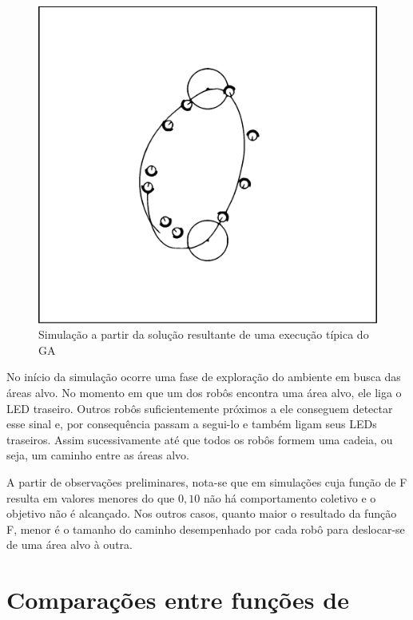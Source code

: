 \begin{figure}[h]
\begin{minipage}{.3\textwidth}
    \end{minipage}%
    \begin{minipage}{.3\textwidth}
        \includegraphics[width=\textwidth]{figures/simulation-28-t120-bold}
    \end{minipage}

    \caption{Simulação a partir da solução resultante de uma execução típica do GA}
    \label{fig:sim}
\end{figure}

No início da simulação ocorre uma fase de exploração do ambiente em busca das áreas alvo. No momento em que um dos robôs encontra uma área alvo, ele liga o LED traseiro. Outros robôs suficientemente próximos a ele conseguem detectar esse sinal e, por consequência passam a segui-lo e também ligam seus LEDs traseiros. Assim sucessivamente até que todos os robôs formem uma cadeia, ou seja, um caminho entre as áreas alvo.

A partir de observações preliminares, nota-se que em simulações cuja função de \fitness F resulta em valores menores do que $0,10$ não há comportamento coletivo e o objetivo não é alcançado. Nos outros casos, quanto maior o resultado da função F, menor é o tamanho do caminho desempenhado por cada robô para deslocar-se de uma área alvo à outra.

\section{Comparações entre funções de \fitness}

